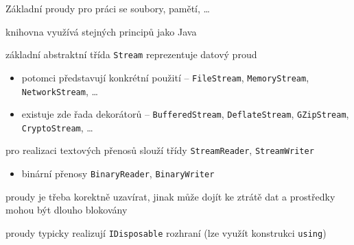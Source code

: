 %
%
%
%
%


\begin{frame}[fragile]
\vfill
\begin{bitemize}{Základní proudy pro práci se soubory, pamětí, \ldots}
\item knihovna využívá stejných principů jako Java
\item základní abstraktní třída \lstinline|Stream| reprezentuje datový proud
\begin{itemize}
\item potomci představují konkrétní použití -- \lstinline|FileStream|, \lstinline|MemoryStream|, \lstinline|NetworkStream|, \ldots
\item existuje zde řada dekorátorů -- \lstinline|BufferedStream|, \lstinline|DeflateStream|, \lstinline|GZipStream|, \lstinline|CryptoStream|, \ldots
\end{itemize}
\item pro realizaci textových přenosů slouží třídy \lstinline|StreamReader|, \lstinline|StreamWriter|
\begin{itemize}
\item binární přenosy \lstinline|BinaryReader|, \lstinline|BinaryWriter|
\end{itemize}
\end{bitemize}
\vfill
\begin{bitemize}{}
\item proudy je třeba korektně uzavírat, jinak může dojít ke ztrátě dat a prostředky mohou být dlouho blokovány
\item proudy typicky realizují \lstinline|IDisposable| rozhraní (lze využít konstrukci \lstinline|using|)
\end{bitemize}
\vfill
\end{frame}



